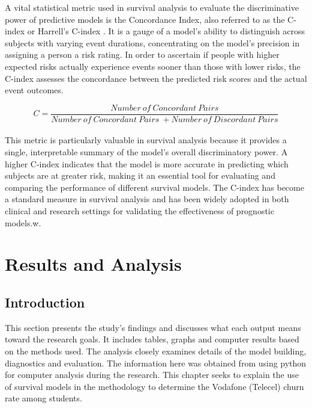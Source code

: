 \documentclass[doublespacing,12pt]{report}
\begin{document}
A vital statistical metric used in survival analysis to evaluate the discriminative power of predictive models is the Concordance Index, also referred to as the C-index or Harrell's C-index \cite{harrell1982evaluating}. It is a gauge of a model's ability to distinguish across subjects with varying event durations, concentrating on the model's precision in assigning a person a risk rating.
In order to ascertain if people with higher expected risks actually experience events sooner than those with lower risks, the C-index assesses the concordance between the predicted risk scores and the actual event outcomes.

\begin{equation}
C=\frac{Number\ of\ Concordant\ Pairs}{Number\ of\ Concordant\ Pairs\ +Number\ of\ Discordant\ Pairs}
\end{equation}\\
This metric is particularly valuable in survival analysis because it provides a single, interpretable summary of the model's overall discriminatory power. A higher C-index indicates that the model is more accurate in predicting which subjects are at greater risk, making it an essential tool for evaluating and comparing the performance of different survival models. The C-index has become a standard measure in survival analysis and has been widely adopted in both clinical and research settings for validating the effectiveness of prognostic models.w.



\newpage
\chapter{Results and Analysis}
\section{Introduction}
This section presents the study's findings and discusses what each output means toward the research goals. It includes tables, graphs and computer results based on the methods used. The analysis closely examines details of the model building, diagnostics and evaluation. The information here was obtained from using python for computer analysis during the research. This chapter seeks to explain the use of survival models in the methodology to determine the Vodafone (Telecel) churn rate among students.
\end{document}
